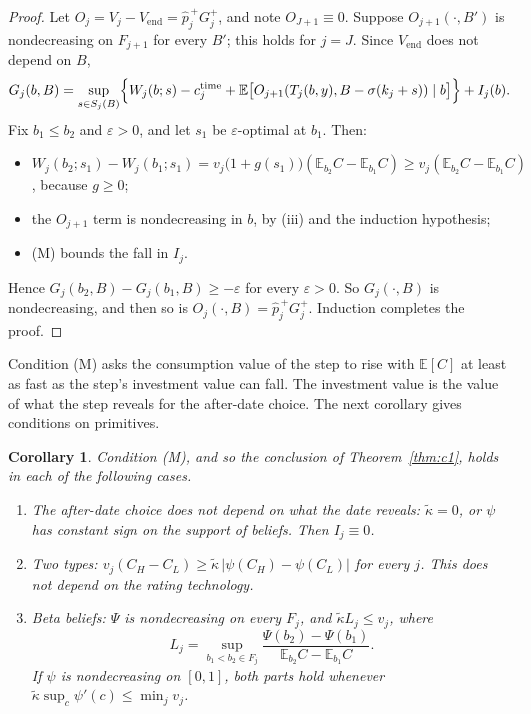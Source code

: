 \documentclass[11pt,a4paper]{article}
\newtheorem{corollary}[theorem]{Corollary}
\theoremstyle{definition}
\theoremstyle{remark}
\newcommand{\E}{\mathbb{E}}
\newcommand{\Vend}{V_{\mathrm{end}}}
\newcommand{\pp}{\hat p}
\newcommand{\kt}{\tilde\kappa}
\begin{document}
\begin{proof}
Let $O_j=V_j-\Vend=\pp_j^{\,+}G_j^{+}$, and note $O_{J+1}\equiv0$. Suppose $O_{j+1}(\cdot,B')$ is nondecreasing on $F_{j+1}$ for every $B'$; this holds for $j=J$. Since $\Vend$ does not depend on $B$,
\[
G_j(b,B)=\sup_{s\in S_j(B)}\Bigl\{W_j(b;s)-c_j^{\mathrm{time}}+\E\bigl[O_{j+1}(T_j(b,y),B-\sigma(k_j+s))\mid b\bigr]\Bigr\}+I_j(b).
\]
Fix $b_1\le b_2$ and $\varepsilon>0$, and let $s_1$ be $\varepsilon$-optimal at $b_1$. Then:
\begin{itemize}[nosep]
\item $W_j(b_2;s_1)-W_j(b_1;s_1)=v_j\bigl(1+g(s_1)\bigr)(\E_{b_2}C-\E_{b_1}C)\ge v_j(\E_{b_2}C-\E_{b_1}C)$, because $g\ge0$;
\item the $O_{j+1}$ term is nondecreasing in $b$, by (iii) and the induction hypothesis;
\item (M) bounds the fall in $I_j$.
\end{itemize}
Hence $G_j(b_2,B)-G_j(b_1,B)\ge-\varepsilon$ for every $\varepsilon>0$. So $G_j(\cdot,B)$ is nondecreasing, and then so is $O_j(\cdot,B)=\pp_j^{\,+}G_j^+$. Induction completes the proof.
\end{proof}

Condition (M) asks the consumption value of the step to rise with $\E[C]$ at least as fast as the step's investment value can fall. The investment value is the value of what the step reveals for the after-date choice. The next corollary gives conditions on primitives.

\begin{corollary}\label{cor:c1}
Condition (M), and so the conclusion of Theorem~\ref{thm:c1}, holds in each of the following cases.
\begin{enumerate}[label=(\alph*)]
\item \emph{The after-date choice does not depend on what the date reveals:} $\kt=0$, or $\psi$ has constant sign on the support of beliefs. Then $I_j\equiv0$.
\item \emph{Two types:} $v_j(C_H-C_L)\ge\kt\,\lvert\psi(C_H)-\psi(C_L)\rvert$ for every $j$. This does not depend on the rating technology.
\item \emph{Beta beliefs:} $\Psi$ is nondecreasing on every $F_j$, and $\kt L_j\le v_j$, where
\[
L_j=\sup_{b_1<b_2\in F_j}\frac{\Psi(b_2)-\Psi(b_1)}{\E_{b_2}C-\E_{b_1}C}.
\]
If $\psi$ is nondecreasing on $[0,1]$, both parts hold whenever $\kt\sup_c\psi'(c)\le\min_jv_j$.
\end{enumerate}
\end{corollary}
\end{document}
